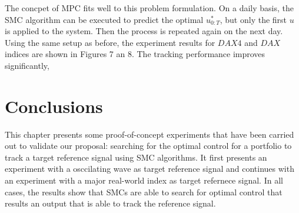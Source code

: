 The concpet of MPC fits well to this problem formulation. On a daily basis, the SMC algorithm can be executed to predict the optimal $u^*_{0:T}$, but only the first $u$ is applied to the system. Then the process is repeated again on the next day. Using the same setup as before, the experiment results for $DAX4$ and $DAX$ indices are shown in Figures 7 an 8. The tracking performance improves significantly,
 
\section{Conclusions}
\label{sec:conclusion5}
This chapter presents some proof-of-concept experiments that have been
carried out to validate our proposal: searching for the optimal control for a portfolio to track a target reference signal using SMC algorithms. It first presents an experiment with a osccilating wave as target reference signal and continues with an experiment with a major real-world index as target refernece signal. In all cases, the results show that SMCs are able to search for optimal control that results an output that is able to track the reference signal.
